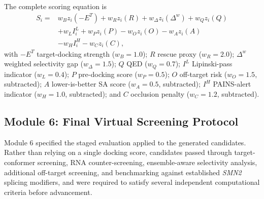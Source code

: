 \documentclass[journal]{IEEEtran}
\begin{document}
The complete scoring equation is
\begin{equation}
\begin{aligned}
S_{i} ={}& w_{B} z_{i}\!\left(-E^{T}\right) + w_{R} z_{i}(R)
         + w_{\Delta} z_{i}(\Delta^{w}) + w_{Q} z_{i}(Q)\\
      &+ w_{L} I_{i}^{L} + w_{P} z_{i}(P) - w_{O} z_{i}(O)
         - w_{A} z_{i}(A)\\
      &- w_{H} I_{i}^{H} - w_{C} z_{i}(C),
\end{aligned}
\label{eq:srsi}
\end{equation}
with $-E^{T}$ target-docking strength ($w_{B} = 1.0$); $R$ rescue proxy
($w_{R} = 2.0$); $\Delta^{w}$ weighted selectivity gap
($w_{\Delta} = 1.5$); $Q$ QED ($w_{Q} = 0.7$); $I^{L}$ Lipinski-pass
indicator ($w_{L} = 0.4$); $P$ pre-docking score ($w_{P} = 0.5$); $O$
off-target risk ($w_{O} = 1.5$, subtracted); $A$ lower-is-better SA
score ($w_{A} = 0.5$, subtracted); $I^{H}$ PAINS-alert indicator
($w_{H} = 1.0$, subtracted); and $C$ occlusion penalty ($w_{C} = 1.2$,
subtracted).

\subsection{Module 6: Final Virtual Screening Protocol}

Module 6 specified the staged evaluation applied to the generated
candidates. Rather than relying on a single docking score, candidates
passed through target-conformer screening, RNA counter-screening,
ensemble-aware selectivity analysis, additional off-target screening,
and benchmarking against established \textit{SMN2} splicing modifiers,
and were required to satisfy several independent computational criteria
before advancement.
\end{document}
